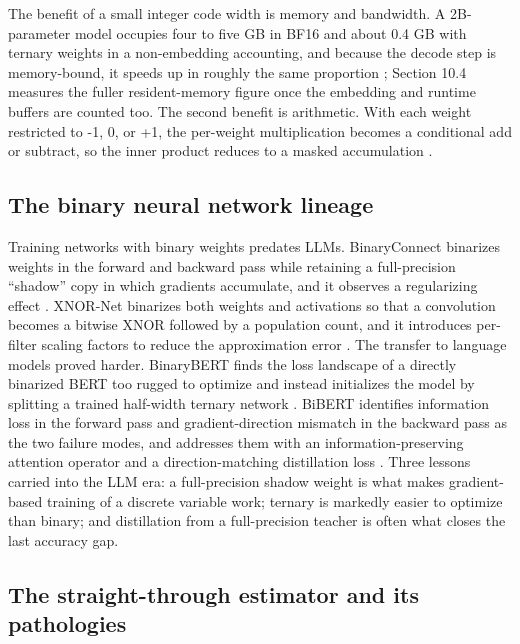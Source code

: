 \documentclass[11pt]{article}
\begin{document}
The benefit of a small integer code width is memory and bandwidth. A 2B-parameter model occupies four
to five GB in BF16 and about 0.4 GB with ternary weights in a non-embedding accounting,
and because the decode step is memory-bound, it speeds up in roughly the same proportion
\cite{Ma2025-BitNet2B4T}; Section 10.4 measures the fuller resident-memory figure once the
embedding and runtime buffers are counted too. The second benefit is arithmetic. With each weight restricted to
-1, 0, or +1, the per-weight multiplication becomes a conditional add or subtract, so the
inner product reduces to a masked accumulation \cite{Malekar2024-MatmulOrNot}.

\subsection{The binary neural network lineage}

Training networks with binary weights predates LLMs. BinaryConnect binarizes weights in
the forward and backward pass while retaining a full-precision ``shadow'' copy in which
gradients accumulate, and it observes a regularizing effect
\cite{Courbariaux2015-BinaryConnect}. XNOR-Net binarizes both weights and activations so that
a convolution becomes a bitwise XNOR followed by a population count, and it introduces
per-filter scaling factors to reduce the approximation error \cite{Rastegari2016-XNORNet}.
The transfer to language models proved harder. BinaryBERT finds the loss landscape of a
directly binarized BERT too rugged to optimize and instead initializes the model by
splitting a trained half-width ternary network \cite{Bai2021-BinaryBERT}. BiBERT identifies
information loss in the forward pass and gradient-direction mismatch in the backward
pass as the two failure modes, and addresses them with an information-preserving
attention operator and a direction-matching distillation loss \cite{Qin2022-BiBERT}. Three
lessons carried into the LLM era: a full-precision shadow weight is what makes
gradient-based training of a discrete variable work; ternary is markedly easier to
optimize than binary; and distillation from a full-precision teacher is often what
closes the last accuracy gap.

\subsection{The straight-through estimator and its pathologies}
\end{document}
